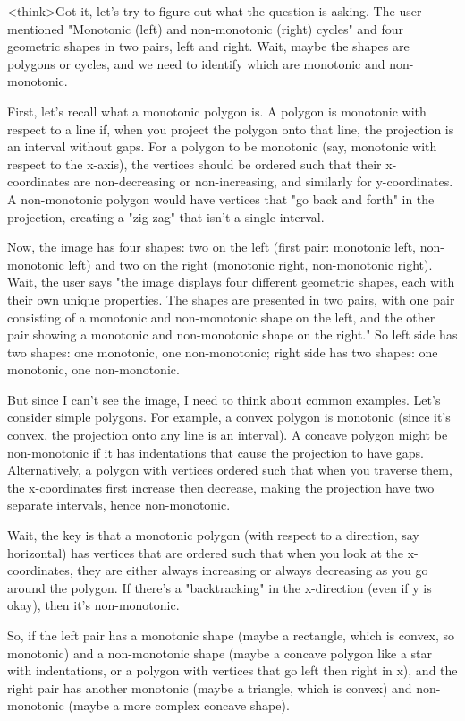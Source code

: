 <think>Got it, let's try to figure out what the question is asking. The user mentioned "Monotonic (left) and non-monotonic (right) cycles" and four geometric shapes in two pairs, left and right. Wait, maybe the shapes are polygons or cycles, and we need to identify which are monotonic and non-monotonic. 

First, let's recall what a monotonic polygon is. A polygon is monotonic with respect to a line if, when you project the polygon onto that line, the projection is an interval without gaps. For a polygon to be monotonic (say, monotonic with respect to the x-axis), the vertices should be ordered such that their x-coordinates are non-decreasing or non-increasing, and similarly for y-coordinates. A non-monotonic polygon would have vertices that "go back and forth" in the projection, creating a "zig-zag" that isn't a single interval.

Now, the image has four shapes: two on the left (first pair: monotonic left, non-monotonic left) and two on the right (monotonic right, non-monotonic right). Wait, the user says "the image displays four different geometric shapes, each with their own unique properties. The shapes are presented in two pairs, with one pair consisting of a monotonic and non-monotonic shape on the left, and the other pair showing a monotonic and non-monotonic shape on the right." So left side has two shapes: one monotonic, one non-monotonic; right side has two shapes: one monotonic, one non-monotonic.

But since I can't see the image, I need to think about common examples. Let's consider simple polygons. For example, a convex polygon is monotonic (since it's convex, the projection onto any line is an interval). A concave polygon might be non-monotonic if it has indentations that cause the projection to have gaps. Alternatively, a polygon with vertices ordered such that when you traverse them, the x-coordinates first increase then decrease, making the projection have two separate intervals, hence non-monotonic.

Wait, the key is that a monotonic polygon (with respect to a direction, say horizontal) has vertices that are ordered such that when you look at the x-coordinates, they are either always increasing or always decreasing as you go around the polygon. If there's a "backtracking" in the x-direction (even if y is okay), then it's non-monotonic.

So, if the left pair has a monotonic shape (maybe a rectangle, which is convex, so monotonic) and a non-monotonic shape (maybe a concave polygon like a star with indentations, or a polygon with vertices that go left then right in x), and the right pair has another monotonic (maybe a triangle, which is convex) and non-monotonic (maybe a more complex concave shape).

